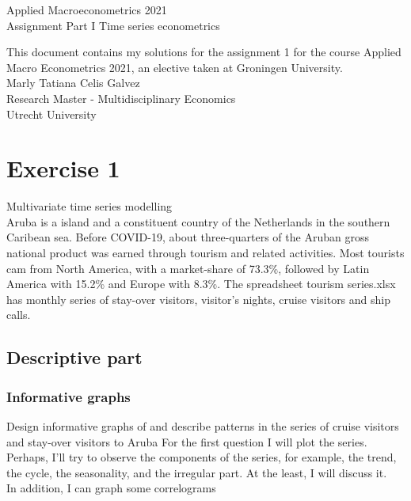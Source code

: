 \documentclass[11pt]{article}
\begin{document}
\begin{center} 
	\Large Applied Macroeconometrics 2021 \\
	Assignment Part I Time series econometrics
\end{center} 

This document contains my solutions for the assignment 1 for the course Applied Macro Econometrics 2021, an elective taken at Groningen University. \\
\indent Marly Tatiana Celis Galvez \\
\indent Research Master - Multidisciplinary Economics \\
\indent Utrecht University

\tableofcontents






\newpage
\section{Exercise 1}

Multivariate time series modelling\\

Aruba is a island and a constituent country of the Netherlands in the southern Caribean sea. Before COVID-19, about three-quarters of the Aruban gross national product was earned through tourism and related activities. Most tourists cam from North America, with a market-share of 73.3\%, followed by Latin America with 15.2\% and Europe with 8.3\%. The spreadsheet tourism series.xlsx has monthly series of stay-over visitors, visitor's nights, cruise visitors and ship calls.

\subsection{Descriptive part}
\subsubsection{Informative graphs}
Design informative graphs of and describe patterns in the series of cruise visitors and stay-over visitors to Aruba
For the first question I will plot the series. Perhaps, I'll try to observe the components of the series, for example, the trend, the  cycle, the seasonality, and the irregular part. At the least, I will discuss it. \\
In addition,  I can graph some correlograms \\
\end{document}
